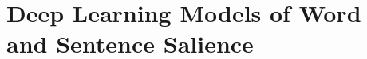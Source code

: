 
\section{Deep Learning Models of Word and Sentence Salience}
\label{sec:chapter4}
\label{sec:deep_learning_salience}

\def\tfidf{TF-IDF}

